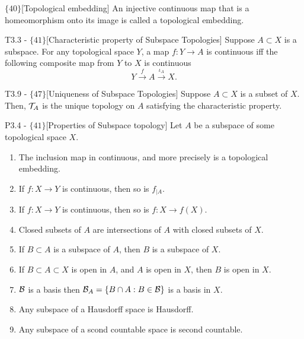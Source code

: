 \documentclass{article}
\begin{document}
\begin{flexidefinition}{$\{40\}$}[Topological embedding]
    An injective continuous map that is a homeomorphism onto its image is called a topological embedding.
\end{flexidefinition}

\begin{flexitheorem}{T3.3 - $\{41\}$}[Characteristic property of Subspace Topologies]
    Suppose $A \subset X$ is a subspace. For any topological space $Y$, a map $f : Y \to A$ is continuous iff the following composite map from $Y$ to $X$ is continuous
    \begin{equation}
        Y \overset{f}{\to} A \overset{\iota_A}{\to} X.
    \end{equation}
\end{flexitheorem}

\begin{flexitheorem}{T3.9 - $\{47\}$}[Uniqueness of Subspace Topologies]
    Suppose $A \subset X$ is a subset of $X$. Then, $\mathcal{T}_A$ is the unique topology on $A$ satisfying the characteristic property.
\end{flexitheorem}

\begin{flexilemma}{P3.4 - $\{41\}$}[Properties of Subspace topology]
    Let $A$ be a subspace of some topological space $X$.
    \begin{enumerate}[label = (\alph*)]
        \item The inclusion map in continuous, and more precisely is a topological embedding.
        \item If $f : X \to Y$ is continuous, then so is $f_{|A}$.
        \item If $f: X \to Y$ is continuous, then so is $f: X \to f(X)$.
        \item Closed subsets of $A$ are intersections of $A$ with closed subsets of $X$.
        \item If $B \subset A$ is a subspace of $A$, then $B$ is a subspace of $X$.
        \item If $B \subset A \subset X$ is open in $A$, and $A$ is open in $X$, then $B$ is open in $X$.
        \item $\mathcal{B}$ is a basis then $\mathcal{B}_A = \{ B \cap A : B \in \mathcal{B}\}$ is a basis in $X$.
        \item Any subspace of a Hausdorff space is Hausdorff.
        \item Any subspace of a scond countable space is second countable.
    \end{enumerate}
\end{flexilemma}
\end{document}
